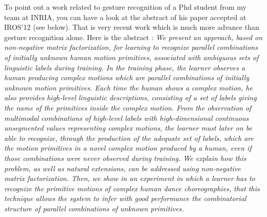 \documentclass[a4paper,11pt]{article}
\begin{document}
To point out a work related to gesture recognition of a Phd student from my team at INRIA, you can have a look at the abstract of his paper \cite{Mangin2012} accepted at IROS'12 (see below). That is very recent work which is much more advance than gesture recognition alone.
Here is the abstract : \textit{We present an approach, based on non-negative matrix factorization, for learning to recognize parallel combinations of initially unknown human motion primitives, associated with ambiguous sets of linguistic labels during training. In the training phase, the learner observes a human producing complex motions which are parallel combinations of initially unknown motion primitives. Each time the human shows a complex motion, he also provides high-level linguistic descriptions, consisting of a set of labels giving the name of the primitives inside the complex motion. From the observation of multimodal combinations of high-level labels with high-dimensional continuous unsegmented values representing complex motions, the learner must later on be able to recognize, through the production of the adequate set of labels, which are the motion primitives in a novel complex motion produced by a human, even if those combinations were never observed during training. We explain how this problem, as well as natural extensions, can be addressed using non-negative matrix factorization. Then, we show in an experiment in which a learner has to recognize the primitive motions of complex human dance choreographies, that this technique allows the system to infer with good performance the combinatorial structure of parallel combinations of unknown primitives.}




\end{document}
